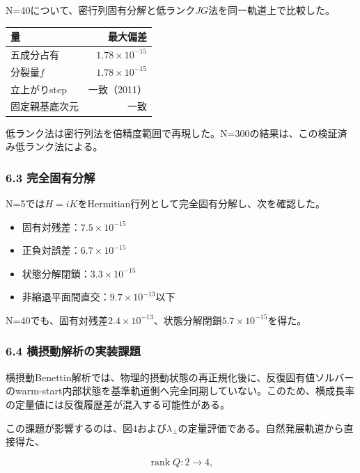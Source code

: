 \documentclass[
  a4paper,
]{ltjsarticle}
\newcounter{none} %
\providecommand{\tightlist}{%
  \setlength{\itemsep}{0pt}\setlength{\parskip}{0pt}}
\begin{document}
N=40について、密行列固有分解と低ランク\(JG\)法を同一軌道上で比較した。

{\def\LTcaptype{none} %
\begin{longtable}[]{@{}lr@{}}
\toprule\noalign{}
量 & 最大偏差 \\
\midrule\noalign{}
\endhead
\bottomrule\noalign{}
\endlastfoot
五成分占有 & \(1.78\times10^{-15}\) \\
分裂量\(f\) & \(1.78\times10^{-15}\) \\
立上がりstep & 一致（2011） \\
固定親基底次元 & 一致 \\
\end{longtable}
}

低ランク法は密行列法を倍精度範囲で再現した。N=300の結果は、この検証済み低ランク法による。

\subsubsection{6.3
完全固有分解}\label{ux5b8cux5168ux56faux6709ux5206ux89e3}

N=5では\(H=iK\)をHermitian行列として完全固有分解し、次を確認した。

\begin{itemize}
\tightlist
\item
  固有対残差：\(7.5\times10^{-15}\)
\item
  正負対誤差：\(6.7\times10^{-15}\)
\item
  状態分解閉鎖：\(3.3\times10^{-15}\)
\item
  非縮退平面間直交：\(9.7\times10^{-13}\)以下
\end{itemize}

N=40でも、固有対残差\(2.4\times10^{-13}\)、状態分解閉鎖\(5.7\times10^{-15}\)を得た。

\subsubsection{6.4
横摂動解析の実装課題}\label{ux6a2aux6442ux52d5ux89e3ux6790ux306eux5b9fux88c5ux8ab2ux984c}

横摂動Benettin解析では、物理的摂動状態の再正規化後に、反復固有値ソルバーのwarm-start内部状態を基準軌道側へ完全同期していない。このため、横成長率の定量値には反復履歴差が混入する可能性がある。

この課題が影響するのは、図4および\(\lambda_\perp\)の定量評価である。自然発展軌道から直接得た、

\[
\operatorname{rank}Q:2\to4,
\]
\end{document}
